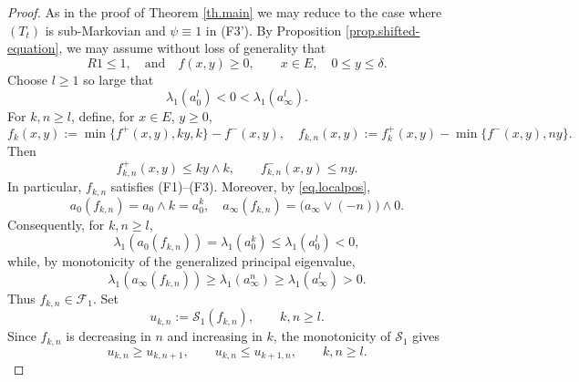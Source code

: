 \documentclass[10pt,a4paper]{amsart}
\begin{document}
\begin{proof}
As in the proof of Theorem \ref{th.main} we may reduce to the case where $(T_t)$ is sub-Markovian and
$\psi\equiv 1$ in (F3'). 
By Proposition \ref{prop.shifted-equation}, we may assume without
loss of generality that
\begin{equation}
\label{eq.localpos}
R1\le 1,\quad \text{and}\quad f(x,y)\ge0,
\qquad x\in E,\quad 0\le y\le\delta.
\end{equation}
Choose $l\ge1$ so large that
\begin{equation}
\label{eq.choose.l}
\lambda_1(a_0^l)<0<\lambda_1(a_\infty^l).
\end{equation}
For $k,n\ge l$, define, for $x\in E$, $y\ge 0$,
\begin{equation}
\label{eq.newfkn}
f_k(x,y)
:=
\min\{f^+(x,y),ky,k\}-f^-(x,y),\quad  f_{k,n}(x,y)
:=f^+_k(x,y)-\min\{f^-(x,y),ny\}.
\end{equation}
Then
\begin{equation}
\label{eq.estmt}
f_{k,n}^+(x,y)\le ky\wedge k,
\qquad
f_{k,n}^-(x,y)\le ny.
\end{equation}
In particular, $f_{k,n}$ satisfies \textup{(F1)--(F3)}.
Moreover, by \eqref{eq.localpos},
\[
a_0(f_{k,n})=a_0\wedge k=a_0^k,\quad a_\infty(f_{k,n})=\bigl(a_\infty\vee(-n)\bigr)\wedge0.
\]
Consequently, for $k,n\ge l$,
\[
\lambda_1(a_0(f_{k,n}))
=
\lambda_1(a_0^k)
\le \lambda_1(a_0^l)<0,
\]
while, by monotonicity of the generalized principal eigenvalue,
\[
\lambda_1(a_\infty(f_{k,n}))
\ge
\lambda_1(a_\infty^n)
\ge
\lambda_1(a_\infty^l)>0.
\]
Thus $f_{k,n}\in\mathscr F_1$.
Set
\[
u_{k,n}:=\mathcal S_1(f_{k,n}),
\qquad k,n\ge l.
\]
Since $f_{k,n}$ is decreasing in $n$ and increasing in $k$, the
monotonicity of $\mathcal S_1$ gives
\begin{equation}
\label{eq.newmon}
u_{k,n}\ge u_{k,n+1},
\qquad
u_{k,n}\le u_{k+1,n},
\qquad k,n\ge l.
\end{equation}


\end{proof}
\end{document}
